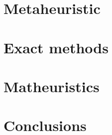 \documentclass[a4paper,12pt]{report}
\newcommand\blankpage{%
    \null
    \thispagestyle{empty}%
    \addtocounter{page}{-1}%
    \newpage}
\begin{document}
\clearpage{\pagestyle{plain}\cleardoublepage}
\chapter{Metaheuristic}


\clearpage{\pagestyle{plain}\cleardoublepage}
\chapter{Exact methods}


\clearpage{\pagestyle{plain}\cleardoublepage}
\chapter{Matheuristics}


\clearpage{\pagestyle{plain}\cleardoublepage}
\chapter{Conclusions}


\afterpage{\blankpage}
    
%

\printbibliography
\end{document}
